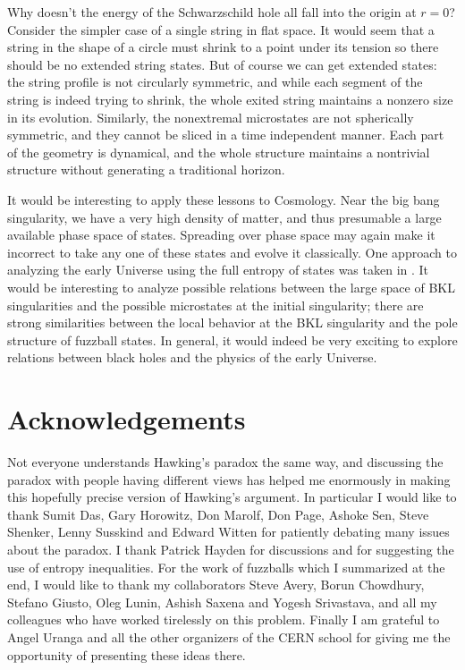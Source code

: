 \documentclass[12pt]{article}
\begin{document}
Why doesn't the energy of the Schwarzschild hole  all fall into the origin at $r=0$? Consider the simpler case of a single string in flat space. It would seem that a string in the shape of a circle must shrink to a point under its tension so there should be no extended string states. But of course we can get    extended states: the string profile is not circularly symmetric, and while each segment of the string is indeed trying to shrink, the whole exited string maintains a nonzero size in its evolution. Similarly, the nonextremal microstates are not spherically symmetric, and they cannot be sliced in a time independent manner. Each part of the geometry is dynamical, and the whole structure maintains a nontrivial structure without generating a traditional horizon.

It would be interesting to apply these lessons to Cosmology. Near the big bang singularity, we have a very high density of matter, and thus presumable a large available phase space of states. Spreading over phase space may again make it incorrect to take any one of these states and evolve it classically. One approach to analyzing the early Universe using the full entropy of states was taken in \cite{cmuniverse}. It would be interesting to analyze possible relations between the large space of BKL singularities and the possible microstates at the initial singularity; there are strong similarities between the local behavior at the BKL singularity and the pole structure of fuzzball states. In general, it would indeed be very exciting to explore relations between  black holes and the physics of the early Universe. 

\section*{Acknowledgements}

 Not everyone understands Hawking's paradox the same way, and discussing the paradox with people having different views has helped me enormously in making this hopefully precise version of Hawking's argument. In particular I would like to thank Sumit Das, Gary Horowitz, Don Marolf, Don Page, Ashoke Sen, Steve Shenker, Lenny Susskind and Edward Witten for patiently debating many issues about the paradox. I thank Patrick Hayden for discussions and for suggesting the use of entropy inequalities. For the work of fuzzballs which I summarized at the end, I would like to thank my collaborators Steve Avery, Borun Chowdhury, Stefano Giusto, Oleg Lunin, Ashish Saxena and  Yogesh Srivastava, and all my colleagues who have worked tirelessly on this problem. Finally I am grateful to Angel Uranga and all the other organizers of the CERN school for giving me the opportunity of presenting these ideas there. 
 
\end{document}
